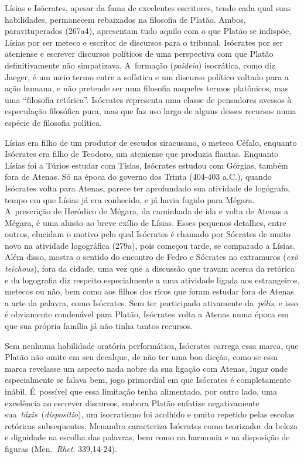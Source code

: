 Lísias e Isócrates, apesar da fama de excelentes escritores, tendo cada
qual suas habilidades, permanecem rebaixados na filosofia de Platão.
Ambos, paravituperados (267a4), apresentam tudo aquilo com o que Platão
se indispõe, Lísias por ser meteco e escritor de discursos para o
tribunal, Isócrates por ser ateniense e escrever discursos políticos de
uma perspectiva com que Platão definitivamente não simpatizava. A~formação
(\emph{paideia}) isocrática, como diz Jaeger, é um meio termo entre a
sofística e um discurso político voltado para a ação humana, e não
pretende ser uma filosofia naqueles termos platônicos, mas uma
``filosofia retórica''. Isócrates representa uma classe de pensadores
avessos à especulação filosófica pura, mas que faz uso largo de alguns
desses recursos numa espécie de filosofia política.

Lísias era filho de um produtor de escudos siracusano, o meteco Céfalo,
enquanto Isócrates era filho de Teodoro, um ateniense que produzia
flautas. Enquanto Lísias foi a Túrios estudar com Tísias, Isócrates
estudou com Górgias, também fora de Atenas. Só na época do governo dos
Trinta (404-403 a.C.), quando Isócrates volta para Atenas, parece ter
aprofundado sua atividade de logógrafo, tempo em que Lísias já era
conhecido, e já havia fugido para Mégara. A~prescrição de Heródico de
Mégara, da caminhada de ida e volta de Atenas a Mégara, é uma alusão ao
breve exílio de Lísias. Esses pequenos detalhes, entre outros, elucidam
o motivo pelo qual Isócrates é chamado por Sócrates de muito novo na atividade
logográfica (279a), pois começou tarde, se comparado a Lísias.
Além disso, mostra o sentido do encontro de Fedro e Sócrates no
extramuros (\emph{exô teíchous}), fora da cidade, uma vez que a
discussão que travam acerca da retórica e da logografia diz respeito
especialmente a uma atividade ligada aos estrangeiros, metecos ou não,
bem como aos filhos dos ricos que foram estudar fora de Atenas a arte da
palavra, como Isócrates. Sem ter participado ativamente da~\emph{pólis},
e isso é obviamente condenável para Platão, Isócrates volta a Atenas
numa época em que sua própria família já não tinha tantos recursos.

Sem nenhuma habilidade oratória performática, Isócrates carrega essa
marca, que Platão não omite em seu decalque, de não ter uma boa dicção,
como se essa marca revelasse um aspecto nada nobre da sua ligação com
Atenas, lugar onde especialmente se falava bem, jogo primordial em que
Isócrates é completamente inábil. É~possível que essa limitação tenha
alimentado, por outro lado, uma excelência ao escrever discursos, embora
Platão enfatize negativamente sua~\emph{táxis}~(\emph{dispositio}), um
isocratismo foi acolhido e muito repetido pelas escolas retóricas
subsequentes. Menandro caracteriza Isócrates como teorizador da beleza e
dignidade na escolha das palavras, bem como na harmonia e na disposição
de figuras (Men.~\emph{Rhet}. 339,14-24).

